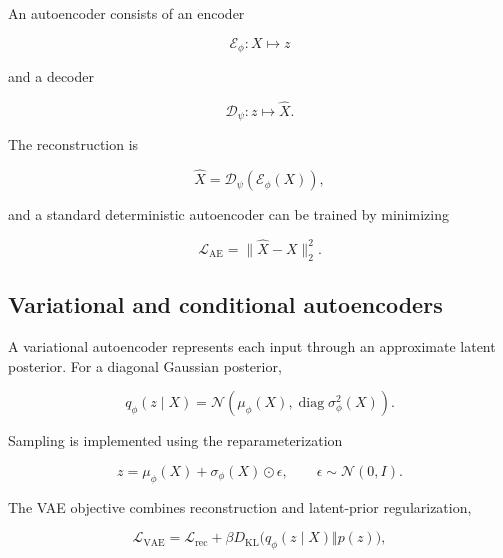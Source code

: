 An autoencoder consists of an encoder

\begin{equation}
\label{eq:219}
\mathcal E_{\phi}:X\longmapsto z
\end{equation}

and a decoder

\begin{equation}
\label{eq:220}
\mathcal D_{\psi}:z\longmapsto\widehat X.
\end{equation}

The reconstruction is

\begin{equation}
\label{eq:221}
\widehat X=\mathcal D_{\psi}(\mathcal E_{\phi}(X)),
\end{equation}

and a standard deterministic autoencoder can be trained by minimizing

\begin{equation}
\label{eq:222}
\mathcal L_{\mathrm{AE}}=\|\widehat X-X\|_2^2.
\end{equation}

\subsection{Variational and conditional autoencoders}
\label{sec:auxiliary_theoretical_results_variational_and_conditional_autoencoders}

A variational autoencoder represents each input through an approximate latent posterior. For a diagonal Gaussian posterior,

\begin{equation}
\label{eq:223}
q_{\phi}(z\mid X)=\mathcal N\left(\mu_{\phi}(X),\operatorname{diag}\sigma_{\phi}^2(X)\right).
\end{equation}

Sampling is implemented using the reparameterization

\begin{equation}
\label{eq:224}
z=\mu_{\phi}(X)+\sigma_{\phi}(X)\odot\epsilon,\qquad\epsilon\sim\mathcal N(0,I).
\end{equation}

The VAE objective combines reconstruction and latent-prior regularization,

\begin{equation}
\label{eq:225}
\mathcal L_{\mathrm{VAE}}=\mathcal L_{\mathrm{rec}}+\beta D_{\mathrm{KL}}\bigl(q_{\phi}(z\mid X)\Vert p(z)\bigr),
\end{equation}


